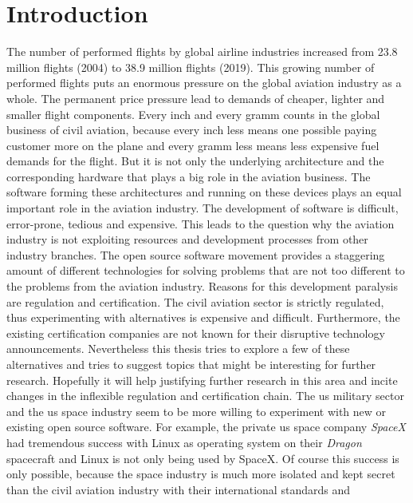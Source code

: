 \documentclass[titlepage]{report}
\begin{document}
\chapter{Introduction}\label{chapter:introduction}
The number of performed flights by global airline industries increased from 23.8 million flights (2004)
to 38.9 million flights (2019)\cite{STATISTA}. This growing number of performed flights puts an enormous
pressure on the global aviation industry as a whole. The permanent price pressure lead to demands of
cheaper, lighter and smaller flight components\cite{prisaznuk1992integrated}. Every inch and every gramm 
counts in the global business of civil aviation, because every inch less means one possible paying customer 
more on the plane and every gramm less means less expensive fuel demands for the flight. But it is not only
the underlying architecture and the corresponding hardware that plays a big role in the aviation business.
The software forming these architectures and running on these devices plays an equal important role
in the aviation industry. The development of software is difficult, error-prone, tedious and expensive. This leads
to the question why the aviation industry is not exploiting resources and development processes from other industry branches.
The open source software movement provides a staggering amount of different technologies for solving problems
that are not too different to the problems from the aviation industry. Reasons for this development paralysis
are regulation and certification. The civil aviation sector is strictly regulated, thus experimenting with alternatives
is expensive and difficult. Furthermore, the existing certification companies are not known for their disruptive
technology announcements. Nevertheless this thesis tries to explore a few of these alternatives and tries to
suggest topics that might be interesting for further research. Hopefully it will help justifying further research
in this area and incite changes in the inflexible regulation and certification chain. The \gls{us} military sector 
and the \gls{us} space industry seem to be more willing to experiment with new or existing open source software. 
For example, the private \gls{us} space company \emph{SpaceX} had tremendous success with Linux as operating 
system on their \emph{Dragon} spacecraft\cite{gruen2012linux} and Linux is not only being used by 
SpaceX\cite{leppinen2017current}. Of course this success is only possible, because the space industry 
is much more isolated and kept secret than the civil aviation industry with their international standards and 
\end{document}
